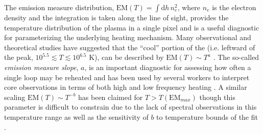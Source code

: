 The emission measure distribution, $\mathrm{EM}(T)=\int\mathrm{d}h\,n_e^2$, where $n_e$ is the electron density and the integration is taken along the line of sight, provides the temperature distribution of the plasma in a single pixel and is a useful diagnostic for parameterizing the underlying heating mechanism. Many observational and theoretical studies have suggested that the ``cool'' portion of the \dem{} (i.e. leftward of the peak, $10^{5.5}\lesssim T\lesssim10^{6.5}$ K), can be described by $\mathrm{EM}(T)\sim T^a$ \citep{jordan_structure_1976,cargill_implications_1994,cargill_nanoflare_2004,warren_systematic_2012}. The so-called \textit{emission measure slope}, $a$, is an important diagnostic for assessing how often a single loop may be reheated and has been used by several workers to interpret \AR{} core observations in terms of both high and low frequency heating \citep[see Table 3 of][and references therin]{bradshaw_diagnosing_2012}. A similar scaling $\mathrm{EM}(T)\sim T^{-b}$ has been claimed for $T>T(\mathrm{EM}_{max})$ though this parameter is difficult to constrain due to the lack of spectral observations in this temperature range \citep{winebarger_defining_2012} as well as the sensitivity of $b$ to temperature bounds of the fit \citep[see section 3.3.1 of][]{barnes_inference_2016-1}.

